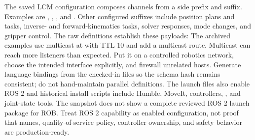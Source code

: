 \markdownRendererSectionEnd \markdownRendererSectionBegin
{}\markdownRendererInterblockSeparator
{}The saved LCM configuration composes channels from a side prefix and suffix. Examples are , , , and . Other configured suffixes include position plans and tasks, inverse- and forward-kinematics tasks, solver responses, mode changes, and gripper control.\markdownRendererParagraphSeparator
{}The raw definitions establish these payloads:\markdownRendererInterblockSeparator
{}\markdownRendererInterblockSeparator
{}The archived examples use multicast at  with TTL 10 and add a multicast route. Multicast can reach more listeners than expected. Put it on a controlled robotics network, choose the intended interface explicitly, and firewall unrelated hosts. Generate language bindings from the checked-in  files so the schema hash remains consistent; do not hand-maintain parallel definitions.\markdownRendererParagraphSeparator
{}The launch files also enable ROS 2 and historical install scripts include Humble, MoveIt, controllers, , and joint-state tools. The snapshot does not show a complete reviewed ROS 2 launch package for ROB. Treat ROS 2 capability as enabled configuration, not proof that names, quality-of-service policy, controller ownership, and safety behavior are production-ready.\markdownRendererInterblockSeparator
